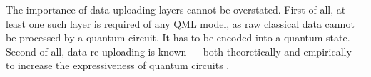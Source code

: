 \documentclass[runningheads]{llncs}
\begin{document}
The importance of data uploading layers cannot be overstated. First of all, at least one such layer is required of any
QML model, as raw classical data cannot be processed by a quantum circuit. It has to be encoded into a quantum state.
Second of all, data re-uploading is known --- both theoretically and empirically --- to increase the expressiveness of
quantum circuits \cite{schuld_effect_2021}.



%

\end{document}
